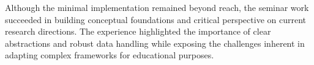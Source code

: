 Although the minimal implementation remained beyond reach, the seminar work succeeded in building conceptual foundations and critical perspective on current research directions. The experience highlighted the importance of clear abstractions and robust data handling while exposing the challenges inherent in adapting complex frameworks for educational purposes.
